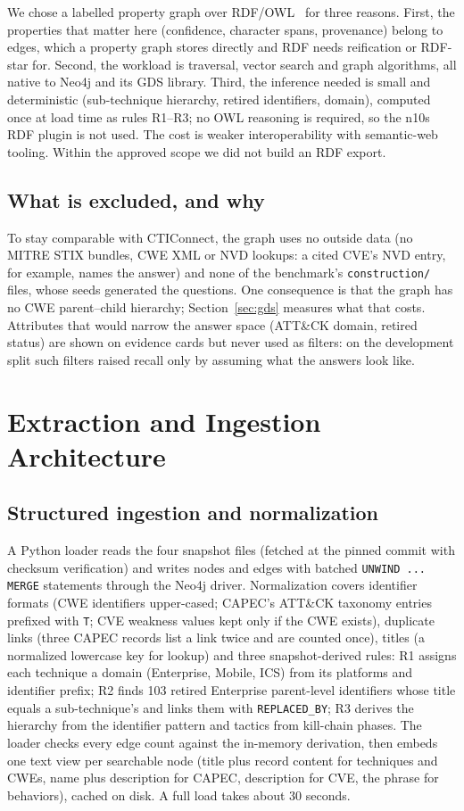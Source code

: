 \documentclass[conference]{IEEEtran}
\newcommand{\id}[1]{\texttt{#1}}
\begin{document}
We chose a labelled property graph over RDF/OWL~\cite{hogan2021kg} for three reasons. First, the properties that matter here (confidence, character spans, provenance) belong to edges, which a property graph stores directly and RDF needs reification or RDF-star for. Second, the workload is traversal, vector search and graph algorithms, all native to Neo4j and its GDS library. Third, the inference needed is small and deterministic (sub-technique hierarchy, retired identifiers, domain), computed once at load time as rules R1--R3; no OWL reasoning is required, so the n10s RDF plugin is not used. The cost is weaker interoperability with semantic-web tooling. Within the approved scope we did not build an RDF export.

\subsection{What is excluded, and why}

To stay comparable with CTIConnect, the graph uses no outside data (no MITRE STIX bundles, CWE XML or NVD lookups: a cited CVE's NVD entry, for example, names the answer) and none of the benchmark's \texttt{construction/} files, whose seeds generated the questions. One consequence is that the graph has no CWE parent--child hierarchy; Section~\ref{sec:gds} measures what that costs. Attributes that would narrow the answer space (ATT\&CK domain, retired status) are shown on evidence cards but never used as filters: on the development split such filters raised recall only by assuming what the answers look like.

\section{Extraction and Ingestion Architecture}\label{sec:extraction}

\subsection{Structured ingestion and normalization}

A Python loader reads the four snapshot files (fetched at the pinned commit with checksum verification) and writes nodes and edges with batched \texttt{UNWIND ... MERGE} statements through the Neo4j driver. Normalization covers identifier formats (CWE identifiers upper-cased; CAPEC's ATT\&CK taxonomy entries prefixed with \id{T}; CVE weakness values kept only if the CWE exists), duplicate links (three CAPEC records list a link twice and are counted once), titles (a normalized lowercase key for lookup) and three snapshot-derived rules: R1 assigns each technique a domain (Enterprise, Mobile, ICS) from its platforms and identifier prefix; R2 finds 103 retired Enterprise parent-level identifiers whose title equals a sub-technique's and links them with \texttt{REPLACED\_BY}; R3 derives the hierarchy from the identifier pattern and tactics from kill-chain phases. The loader checks every edge count against the in-memory derivation, then embeds one text view per searchable node (title plus record content for techniques and CWEs, name plus description for CAPEC, description for CVE, the phrase for behaviors), cached on disk. A full load takes about 30 seconds.
\end{document}
